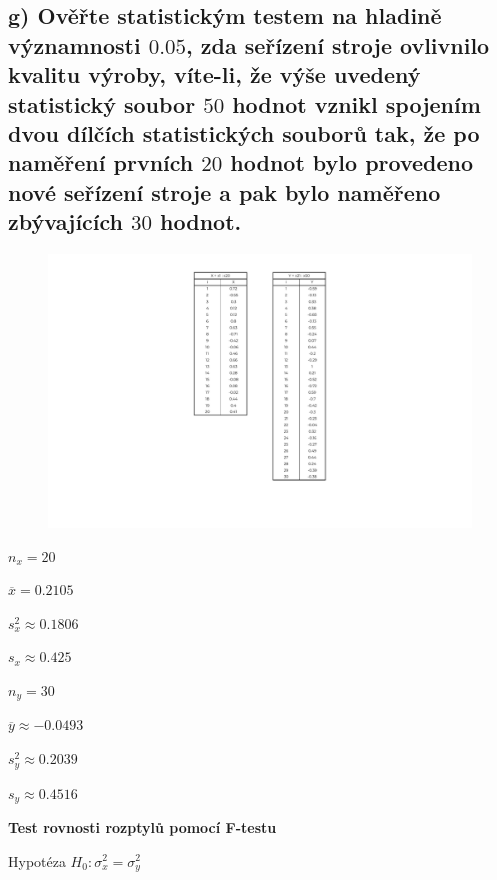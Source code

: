 \documentclass[11pt, a4paper, titlepage]{article}
\begin{document}
\subsection*{g) Ověřte statistickým testem na hladině významnosti $0.05$, zda seřízení stroje ovlivnilo kvalitu výroby, víte-li, že výše uvedený statistický soubor $50$ hodnot vznikl spojením dvou dílčích statistických souborů tak, že po naměření prvních $20$ hodnot bylo provedeno nové seřízení stroje a pak bylo naměřeno zbývajících $30$ hodnot.}
\bigskip

\begin{figure}[H]
    \centering
    \includegraphics[width=.7\linewidth]{images/1-g-1-crop.pdf}
\end{figure}

\newpage

\begin{minipage}{0.49\textwidth}
    ${\displaystyle n_x = 20}$
    \medskip

    ${\displaystyle \overline{x} = 0.2105}$
    \medskip

    ${\displaystyle s_x^2 \approx 0.1806}$
    \medskip

    ${\displaystyle s_x \approx 0.425}$
\end{minipage}
%
\begin{minipage}{0.49\textwidth}
    ${\displaystyle n_y = 30}$
    \medskip

    ${\displaystyle \overline{y} \approx -0.0493}$
    \medskip

    ${\displaystyle s_y^2 \approx 0.2039}$
    \medskip

    ${\displaystyle s_y \approx 0.4516}$
\end{minipage}
\bigskip
\bigskip



\textbf{Test rovnosti rozptylů pomocí F-testu}
\medskip

Hypotéza ${\displaystyle H_0 : \sigma_x^2 = \sigma_y^2}$
\medskip
\end{document}
